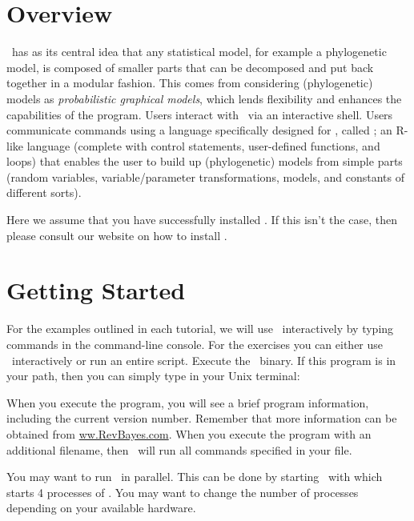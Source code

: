 
\section{Overview}

\RevBayes~has as its central idea that any statistical model, for example a phylogenetic model, is composed of smaller parts that can be decomposed and put back together in a modular fashion. This comes from considering (phylogenetic) models as \textit{probabilistic graphical models}, which lends flexibility and enhances the capabilities of the program. 
Users interact with \RevBayes~via an interactive shell.
Users communicate commands using a language specifically designed for \RevBayes, called \Rev; an R-like language (complete with control statements, user-defined functions, and loops) that enables the user to build up (phylogenetic) models from simple parts (random variables, variable/parameter transformations, models, and constants of different sorts).
 
Here we assume that you have successfully installed \RevBayes.
If this isn't the case, then please consult our website on how to install \RevBayes.



\bigskip
\section{Getting Started}

For the examples outlined in each tutorial, we will use \RevBayes~interactively by typing commands in the command-line console.
For the exercises you can either use \RevBayes~interactively or run an entire script.
Execute the \RevBayes~binary. If this program is in your path, then you can simply type in your Unix terminal:


When you execute the program, you will see a brief program information, including the current version number. 
Remember that more information can be obtained from \href{www.RevBayes.com}{ww.RevBayes.com}.
When you execute the program with an additional filename, \EG
{}
then \RevBayes~will run all commands specified in your file.

You may want to run \RevBayes~in parallel.
This can be done by starting \RevBayes~with
which starts 4 processes of \RevBayes.
You may want to change the number of processes depending on your available hardware.

